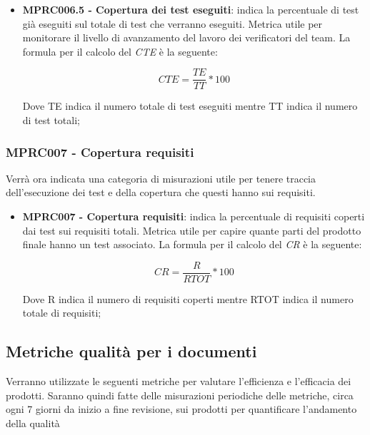 {\begin{itemize}
    \begin{center}
        \begin{displaymath}
            CD = \frac{DT}{DTU} * 100
        \end{displaymath}
    \end{center}
    Dove DT indica il numero totale di difetti trovati nella fase di test mentre DTU indica la somma dei difetti trovati nei test e quelli trovati durante l'uso del software;
    \item \textbf{MPRC006.5 - Copertura dei test eseguiti}: indica la percentuale di test già eseguiti sul totale di test che verranno eseguiti. Metrica utile per monitorare il livello di avanzamento del lavoro dei verificatori del team. La formula per il calcolo del \textit{CTE} è la seguente:
    \begin{center}
        \begin{displaymath}
            CTE = \frac{TE}{TT} * 100
        \end{displaymath}
    \end{center}
    Dove TE indica il numero totale di test eseguiti mentre TT indica il numero di test totali;
\end{itemize}
\subsubsection{MPRC007 - Copertura requisiti}
Verrà ora indicata una categoria di misurazioni utile per tenere traccia dell'esecuzione dei test e della copertura che questi hanno sui requisiti.

\begin{itemize}
    \item \textbf{MPRC007 - Copertura requisiti}: indica la percentuale di requisiti coperti dai test sui requisiti totali. Metrica utile per capire quante parti del prodotto finale hanno un test associato. La formula per il calcolo del \textit{CR} è la seguente:
    \begin{center}
        \begin{displaymath}
            CR = \frac{R}{RTOT} * 100
        \end{displaymath}
    \end{center}
    Dove R indica il numero di requisiti coperti mentre RTOT indica il numero totale di requisiti;
\end{itemize}

\subsection{Metriche qualità per i documenti}
\label{sec:qualita_prodotto}
Verranno utilizzate le seguenti metriche per valutare l’efficienza e l’efficacia dei prodotti. Saranno quindi fatte delle misurazioni periodiche delle metriche, circa ogni 7 giorni da inizio a fine revisione, sui prodotti per quantificare l'andamento della qualità
}
